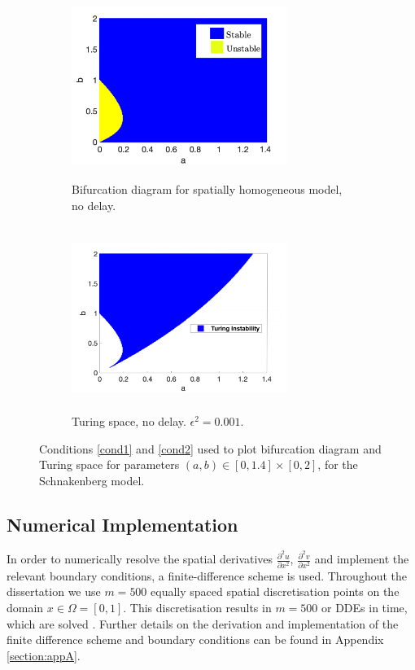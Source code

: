 \begin{figure}[H]
    \centering
    \begin{subfigure}[t]{0.45\textwidth}
        \centering
        \includegraphics[width=7cm,height = 6cm]{bifsh1.png}
        \caption{Bifurcation diagram for spatially homogeneous model, no delay.}
        \label{fig:bifsh}
    \end{subfigure}
    \hfill
    \begin{subfigure}[t]{0.45\textwidth}
        \centering
        \includegraphics[width=7cm,height = 6cm]{turingspace.png}
        \caption{Turing space, no delay. $\epsilon^2=0.001$.}
        \label{fig:turingspace}
    \end{subfigure}
    \caption{Conditions \eqref{cond1} and \eqref{cond2} used to plot bifurcation diagram and Turing space for parameters $(a,b)\in[0,1.4]\times[0,2]$, for the Schnakenberg model.}
    \label{fig:dispfixed}
\end{figure}

\subsection{Numerical Implementation}\label{section:numimp}
In order to numerically resolve the spatial derivatives $\frac{\partial^2 u}{\partial x^2}$, $\frac{\partial^2 v}{\partial x^2}$ and implement the relevant boundary conditions, a finite-difference scheme is used. Throughout the dissertation we use $m=500$ equally spaced spatial discretisation points on the domain $x\in\Omega=[0,1]$. This discretisation results in $m=500$  or DDEs in time, which are solved . Further details on the derivation and implementation of the finite difference scheme and boundary conditions can be found in Appendix \ref{section:appA}.

